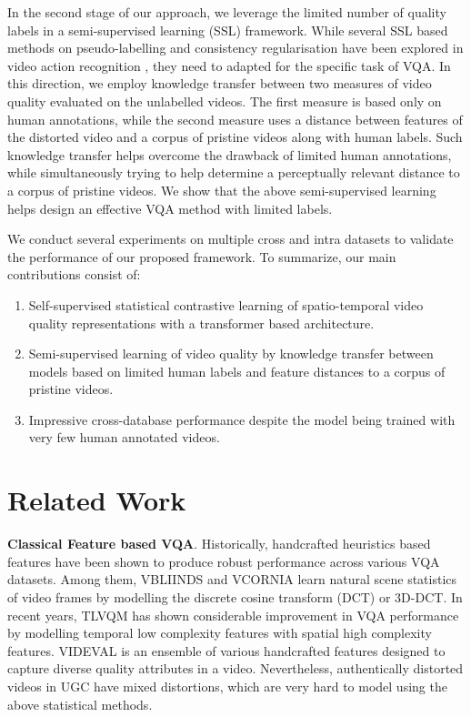 \documentclass[10pt,twocolumn,letterpaper]{article}
\begin{document}
In the second stage of our approach, we leverage the limited number of quality labels in a semi-supervised learning (SSL) framework. While several SSL based methods on pseudo-labelling and consistency regularisation have been explored in video action recognition \cite{cmpl,TCL,video_action_ssl}, they need to adapted for the specific task of VQA. In this direction, we employ knowledge transfer between two measures of video quality evaluated on the unlabelled videos. The first measure is based only on human annotations, while the second measure uses a distance between features of the distorted video and a corpus of pristine videos along with human labels. Such knowledge transfer helps overcome the drawback of limited human annotations, while simultaneously trying to help determine a perceptually relevant distance to a corpus of pristine videos. We show that the above semi-supervised learning helps design an effective VQA method with limited labels.

We conduct several experiments on multiple cross and intra datasets to validate the performance of our proposed framework. %
To summarize, our main contributions consist of:
\begin{enumerate}
    \item Self-supervised statistical contrastive learning of spatio-temporal video quality representations with a transformer based architecture.
    \item Semi-supervised learning of video quality by knowledge transfer between models based on limited human labels and feature distances to a corpus of pristine videos. 
    \item Impressive cross-database performance despite the model being trained with very few human annotated videos. 
\end{enumerate}

\section{Related Work}

\textbf{Classical Feature based VQA}. Historically, handcrafted heuristics based features have been shown to produce robust performance across various VQA datasets. Among them, VBLIINDS \cite{vbliind} and VCORNIA \cite{vcornia} learn natural scene statistics of video frames by modelling the discrete cosine transform (DCT) or 3D-DCT. In recent years, TLVQM \cite{tlvqm} has shown considerable improvement in VQA performance by modelling temporal low complexity features with spatial high complexity features. VIDEVAL \cite{videval} is an ensemble of various handcrafted features designed to capture diverse quality attributes in a video. Nevertheless, authentically distorted videos in UGC have mixed distortions, which are very hard to model using the above statistical methods.
\end{document}
